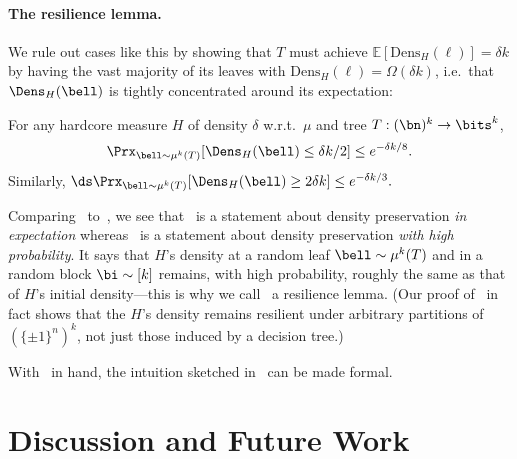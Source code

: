 \paragraph{The resilience lemma.} We rule out cases like this by showing that $T$ must achieve $\mathbb{E}[\mathrm{Dens}_H(\boldsymbol{\ell})]=  \delta k$ by having the vast majority of its leaves with $\mathrm{Dens}_H(\ell) = \Omega(\delta k)$, i.e.~that $\Dens_H(\bell)$ is tightly concentrated around its expectation:  
\medskip 

\begin{tcolorbox}[colback = white,arc=1mm, boxrule=0.25mm]
\begin{lemma}
\label{lem:resilience lemma}
For any hardcore measure $H$ of density $\delta$ w.r.t.~$\mu$ and tree $T:(\bn)^k \to \bits^k$,
\begin{equation*}
    \Prx_{\bell \sim \mu^k(T)}[\Dens_H(\bell) \leq \delta k/2] \leq e^{-\delta k/8}.
\end{equation*}
Similarly, $\ds \Prx_{\bell \sim \mu^k(T)}[\Dens_H(\bell) \geq 2\delta k] \leq e^{-\delta k/3}.$ 
\end{lemma}
\end{tcolorbox}
\medskip 








Comparing~ to~, we see that~ is a statement about density preservation {\sl in expectation} whereas~ is a statement about density preservation {\sl with high probability}. It says that $H$'s density at a random leaf $\bell\sim \mu^k(T)$ and in a random block $\bi\sim [k]$ remains, with high probability, roughly the same as that of $H$'s initial density---this is why we call~ a resilience lemma. (Our proof of~ in fact shows that the $H$'s density remains resilient under arbitrary partitions of $(\{ \pm 1\}^n)^k$, not just those induced by a decision tree.)


With~ in hand, the intuition sketched in~ can be made formal. 

\section{Discussion and Future Work}

